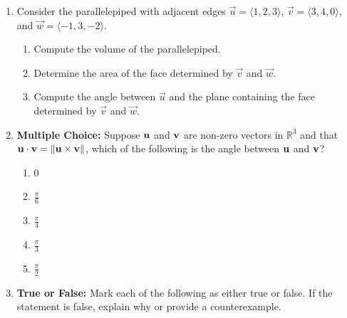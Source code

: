 \documentclass[12pt]{article}
\newif\ifans
\begin{document}
\begin{enumerate}
\begin{enumerate}
\ifans{\fbox{$d=\sqrt{\frac{91}{10}}$}} \fi

\end{enumerate}

\item Consider the parallelepiped with adjacent edges $\overrightarrow{u}=\langle1,2,3\rangle$, $\overrightarrow{v}=\langle3,4,0\rangle$, and $\overrightarrow{w}=\langle-1,3,-2\rangle$.

\begin{enumerate}

\item Compute the volume of the parallelepiped.

\ifans{\fbox{43}} \fi

\item Determine the area of the face determined by $\overrightarrow{v}$ and $\overrightarrow{w}$.

\ifans{\fbox{$\sqrt{269}$}} \fi

\item Compute the angle between $\overrightarrow{u}$ and the plane containing the face determined by $\overrightarrow{v}$ and $\overrightarrow{w}$.

\ifans{\fbox{$\frac{\pi}{2}-\cos^{-1}\left(\frac{43}{\sqrt{14}\sqrt{269}}\right)$}} \fi

\end{enumerate}

\item {\bf Multiple Choice:} Suppose ${\bf u}$ and ${\bf v}$ are non-zero vectors in $\mathbb{R}^3$ and that ${\bf u}\cdot{\bf v}=\|{\bf u}\times{\bf v}\|$, which of the following is the angle between ${\bf u}$ and ${\bf v}$?

\begin{enumerate}

\item 0

\item $\frac{\pi}{6}$

\item $\frac{\pi}{4}$

\item $\frac{\pi}{3}$

\item $\frac{\pi}{2}$

\end{enumerate}

\ifans{\fbox{c}} \fi

\item {\bf True or False:}  Mark each of the following as either true or false. If the statement is false, explain why or provide a counterexample.


\end{enumerate}
\end{document}
